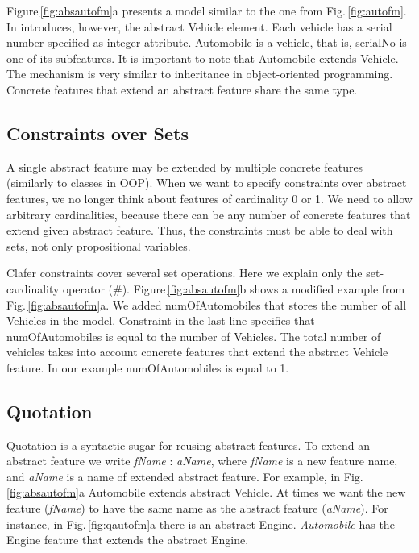 \documentclass{llncs}
\newcommand{\figref}[1]{Fig.\,\ref{fig:#1}}
\newcommand{\Figref}[1]{Figure\,\ref{fig:#1}}
\begin{document}
\Figref{absautofm}a presents a model similar to the one from \figref{autofm}. In introduces, however, the abstract \textsf{Vehicle} element. Each vehicle has a serial number specified as integer attribute. Automobile is a vehicle, that is, \textsf{serialNo} is one of its subfeatures. It is important to note that \textsf{Automobile} extends \textsf{Vehicle}. The mechanism is very similar to inheritance in object-oriented programming. Concrete features that extend an abstract feature share the same type.

\subsection{Constraints over Sets}

A single abstract feature may be extended by multiple concrete features (similarly to classes in OOP). When we want to specify constraints over abstract features, we no longer think about features of cardinality 0 or 1. We need to allow arbitrary cardinalities, because there can be any number of concrete features that extend given abstract feature. Thus, the constraints must be able to deal with sets, not only propositional variables.

Clafer constraints cover several set operations. Here we explain only the set-cardinality operator (\textsf{\#}). \Figref{absautofm}b shows a modified example from \figref{absautofm}a. We added \textsf{numOfAutomobiles} that stores the number of all \textsf{Vehicle}s in the model. Constraint in the last line specifies that \textsf{numOfAutomobiles} is equal to the number of \textsf{Vehicle}s. The total number of vehicles takes into account concrete features that extend the abstract \textsf{Vehicle} feature. In our example \textsf{numOfAutomobiles} is equal to 1.

\subsection{Quotation}

Quotation is a syntactic sugar for reusing abstract features. To extend an abstract feature we write \textit{fName} \textsf{:} \textit{aName}, where \textit{fName} is a new feature name, and \textit{aName} is a name of extended abstract feature. For example, in \figref{absautofm}a \textsf{Automobile} extends abstract \textsf{Vehicle}. At times we want the new feature (\textit{fName}) to have the same name as the abstract feature (\textit{aName}). For instance, in \figref{qautofm}a there is an abstract \textsf{Engine}. \textit{Automobile} has the \textsf{Engine} feature that extends the abstract \textsf{Engine}.
\end{document}
